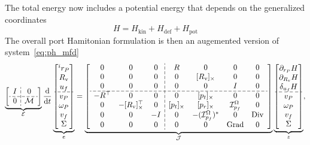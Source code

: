 The total energy now includes a potential energy that depends on the generalized coordinates
\begin{equation*}
H = H_{\text{kin}} + H_{\text{def}} + H_{\text{pot}}
\end{equation*}
The overall port Hamitonian formulation is then an augemented version of system~\eqref{eq:ph_mfd}
\begin{equation}
\label{eq:ph_mfd_all}
\setlength{\dashlinegap}{2pt}
\underbrace{
	{\left[ \begin{array}{c:c}
		I & 0 \\
		\hdashline
		0 & \mathcal{M} \\
		\end{array} \right]}
}_{\mathcal{E}}
\diff{}{t}
\underbrace{\begin{bmatrix}
^i r_P \\ R_{\text{v}} \\ u_f \\\hdashline  v_P \\ \omega_P  \\ v_f  \\ \Sigma \\
\end{bmatrix}}_{e} = 
\underbrace{
	{\left[ \begin{array}{ccc:cccc}
		0 & 0 & 0 &  R & 0 & 0 & 0 \\
		0 & 0 & 0 & 0 & \crmat{R_{\text{v}}} & 0 & 0 \\
		0 & 0 & 0 & 0 & 0 & I & 0 \\ 
		\hdashline 
		-R^\top & 0 & 0 & 0 & \crmat{p_t} & 0 & 0 \\
		0 & -\crmat{R_{\text{v}}}^\top & 0 & \crmat{p_t} & \crmat{p_r} & \mathcal{I}_{p_f}^\Omega & 0 \\
		0 & 0 & -I & 0 & -(\mathcal{I}_{p_f}^\Omega)^* & 0 & \Div \\
		0 & 0 & 0 & 0 & 0 & \Grad & 0 \\
		\end{array} \right]}
	}_{\mathcal{J}}
\underbrace{\begin{bmatrix}
\partial_{r_P}H \\ \partial_{R_\text{v}}H \\ \delta_{u_f} H \\\hdashline  v_P \\ \omega_P  \\ v_f  \\ \Sigma \\
\end{bmatrix}}_{z},
\end{equation} 
